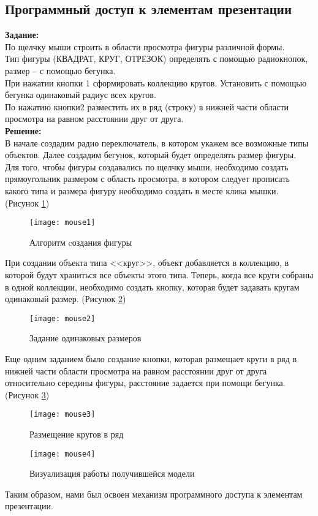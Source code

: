 \subsection*{Программный доступ к элементам презентации}

\textbf{Задание:}\\
По щелчку мыши строить в области просмотра фигуры различной формы.\\
Тип фигуры (КВАДРАТ, КРУГ, ОТРЕЗОК) определять с помощью радиокнопок, размер -- с помощью бегунка.\\
При нажатии кнопки 1 сформировать коллекцию кругов. Установить с помощью бегунка одинаковый радиус всех кругов.\\
По нажатию кнопки2 разместить их в ряд (строку) в нижней части области просмотра на равном расстоянии друг от друга.\\

\textbf{Решение:}\\
В начале создадим радио переключатель, в котором укажем все возможные типы объектов. Далее создадим бегунок, который будет определять размер фигуры.\\

Для того, чтобы фигуры создавались по щелчку мыши, необходимо создать прямоугольник размером с область просмотра, в котором следует  прописать какого типа и размера фигуру необходимо создать в месте клика мышки. (Рисунок \ref{fig:mouse1})

\begin{figure}[h]
	\centering \texttt{[image: mouse1]}
	\caption{Алгоритм cоздания фигуры}
	\label{fig:mouse1}
\end{figure}

\newpage

При создании объекта типа <<круг>>, объект добавляется в коллекцию, в которой будут храниться все объекты этого типа. Теперь, когда все круги собраны в одной коллекции, необходимо создать кнопку, которая будет задавать кругам одинаковый размер. (Рисунок \ref{fig:mouse2})

\begin{figure}[h]
	\centering \texttt{[image: mouse2]}
	\caption{Задание одинаковых размеров}
	\label{fig:mouse2}
\end{figure}

Еще одним заданием было создание кнопки, которая размещает круги в ряд в нижней части области просмотра на равном расстоянии друг от друга относительно середины фигуры, расстояние задается при помощи бегунка. (Рисунок \ref{fig:mouse3})

\begin{figure}[h]
	\centering \texttt{[image: mouse3]}
	\caption{Размещение кругов в ряд}
	\label{fig:mouse3}
\end{figure}

\begin{figure}[h]
	\centering \texttt{[image: mouse4]}
	\caption{Визуализация работы получившейся модели}
	\label{fig:mouse4}
\end{figure}

Таким образом, нами был освоен механизм программного доступа к элементам презентации.\\